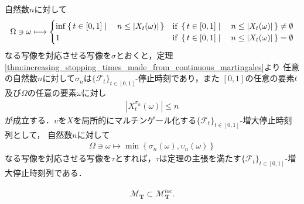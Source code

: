 	\begin{sketch}
		自然数$n$に対して
		\begin{align}
			\Omega \ni \omega \longmapsto
			\begin{cases}
				\operatorname*{inf}_{} \left\{\, t \in [0,1] \mid \quad n \leq |X_{t}(\omega)|\, \right\} 
				& \mbox{if } \left\{\, t \in [0,1] \mid \quad n \leq |X_{t}(\omega)|\, \right\} \neq \emptyset \\
				1 & \mbox{if } \left\{\, t \in [0,1] \mid \quad n \leq |X_{t}(\omega)|\, \right\} = \emptyset
			\end{cases}
		\end{align}
		なる写像を対応させる写像を$\sigma$とおくと，定理\ref{thm:increasing_stopping_times_made_from_continuous_martingales}より
		任意の自然数$n$に対して$\sigma_{n}$は$\{\mathscr{F}_{t}\}_{t \in [0,1]}$-停止時刻であり，また
		$[0,1]$の任意の要素$t$及び$\Omega$の任意の要素$\omega$に対し
		\begin{align}
			\left| X^{\sigma_{n}}_{t}(\omega) \right| \leq n
		\end{align}
		が成立する．$\upsilon$を$X$を局所的にマルチンゲール化する$\{\mathscr{F}_{t}\}_{t \in [0,1]}$-増大停止時刻列として，
		自然数$n$に対して
		\begin{align}
			\Omega \ni \omega \longmapsto \min\left\{ \sigma_{n}(\omega),\upsilon_{n}(\omega) \right\}
		\end{align}
		なる写像を対応させる写像を$\tau$とすれば，$\tau$は定理の主張を満たす$\{\mathscr{F}_{t}\}_{t \in [0,1]}$-増大停止時刻列である．
		\QED
	\end{sketch}
	
	\begin{screen}
		\begin{thm}[マルチンゲールは局所マルチンゲール]
			\begin{align}
				\mathscr{M}_{\mathbf{T}} \subset \mathscr{M}^{loc}_{\mathbf{T}}.
			\end{align}
		\end{thm}
	\end{screen}
	
	\begin{sketch}
		
	\end{sketch}
	
